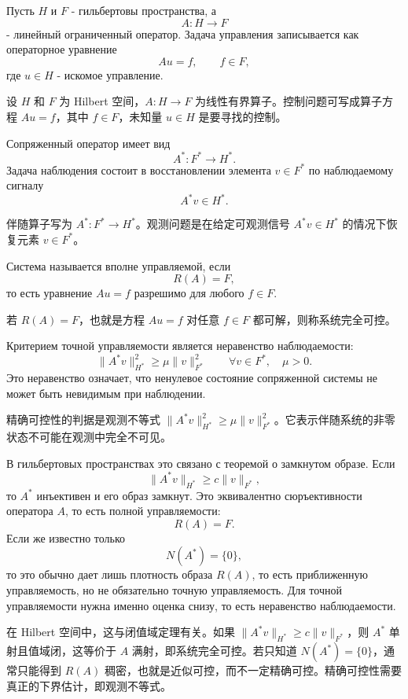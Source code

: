 \documentclass[12pt,a4paper]{article}
\newcommand{\zh}[1]{\par\noindent #1\par}
\begin{document}
\newpage
{}


Пусть $H$ и $F$ - гильбертовы пространства, а
\[
 A:H\to F
\]
- линейный ограниченный оператор. Задача управления записывается как операторное уравнение
\[
 Au=f,\qquad f\in F,
\]
где $u\in H$ - искомое управление.
\zh{设 \(H\) 和 \(F\) 为 Hilbert 空间，\(A:H\to F\) 为线性有界算子。控制问题可写成算子方程 \(Au=f\)，其中 \(f\in F\)，未知量 \(u\in H\) 是要寻找的控制。}

Сопряженный оператор имеет вид
\[
 A^*:F^*\to H^*.
\]
Задача наблюдения состоит в восстановлении элемента $v\in F^*$ по наблюдаемому сигналу
\[
 A^*v\in H^*.
\]
\zh{伴随算子写为 \(A^*:F^*\to H^*\)。观测问题是在给定可观测信号 \(A^*v\in H^*\) 的情况下恢复元素 \(v\in F^*\)。}

Система называется вполне управляемой, если
\[
 R(A)=F,
\]
то есть уравнение $Au=f$ разрешимо для любого $f\in F$.
\zh{若 \(R(A)=F\)，也就是方程 \(Au=f\) 对任意 \(f\in F\) 都可解，则称系统完全可控。}

Критерием точной управляемости является неравенство наблюдаемости:
\[
 \|A^*v\|_{H^*}^2\ge \mu\|v\|_{F^*}^2
 \qquad \forall v\in F^*,\quad \mu>0.
\]
Это неравенство означает, что ненулевое состояние сопряженной системы не может быть невидимым при наблюдении.
\zh{精确可控性的判据是观测不等式 \(\|A^*v\|_{H^*}^2\ge\mu\|v\|_{F^*}^2\)。它表示伴随系统的非零状态不可能在观测中完全不可见。}

В гильбертовых пространствах это связано с теоремой о замкнутом образе. Если
\[
 \|A^*v\|_{H^*}\ge c\|v\|_{F^*},
\]
то $A^*$ инъективен и его образ замкнут. Это эквивалентно сюръективности оператора $A$, то есть полной управляемости:
\[
 R(A)=F.
\]
Если же известно только
\[
 N(A^*)=\{0\},
\]
то это обычно дает лишь плотность образа $R(A)$, то есть приближенную управляемость, но не обязательно точную управляемость. Для точной управляемости нужна именно оценка снизу, то есть неравенство наблюдаемости.
\zh{在 Hilbert 空间中，这与闭值域定理有关。如果 \(\|A^*v\|_{H^*}\ge c\|v\|_{F^*}\)，则 \(A^*\) 单射且值域闭，这等价于 \(A\) 满射，即系统完全可控。若只知道 \(N(A^*)=\{0\}\)，通常只能得到 \(R(A)\) 稠密，也就是近似可控，而不一定精确可控。精确可控性需要真正的下界估计，即观测不等式。}
\end{document}
